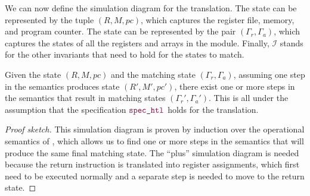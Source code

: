 We can now define the simulation diagram for the translation. The \rtlsubpar{} state can
be represented by the tuple $(R,M,\mathit{pc})$, which captures the register
file, memory, and program counter. The \htl{} state can be represented by the pair
$(\Gamma_{r}, \Gamma_{a})$, which captures the states of all the registers and
arrays in the module.  Finally, $\mathcal{I}$ stands for the other invariants
that need to hold for the states to match.

\begin{lemma}\label{lemma:simulation_diagram}
  Given the \rtlsubpar{} state $(R,M,\mathit{pc})$ and the matching \htl{} state
  $(\Gamma_{r}, \Gamma_{a})$, assuming one step in the \rtlsubpar{} semantics produces
  state $(R',M',\mathit{pc}')$, there exist one or more steps in the \htl{}
  semantics that result in matching states $(\Gamma_{r}', \Gamma_{a}')$.  This
  is all under the assumption that the specification $\yhfunction{spec\_{htl}}$
  holds for the translation.

  {\normalfont\begin{center}
  \end{center}}
\end{lemma}

\begin{proof}[Proof sketch]
  This simulation diagram is proven by induction over the operational semantics
  of \rtlsubpar{}, which allows us to find one or more steps in the \htl{}
  semantics that will produce the same final matching state.  The \enquote{plus}
  simulation diagram is needed because the return instruction is translated into
  register assignments, which first need to be executed normally and a separate
  step is needed to move to the return state.
\end{proof}

